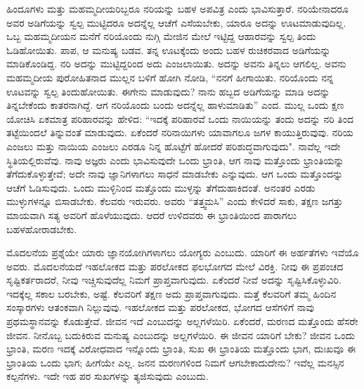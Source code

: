 ಹಿಂದೂಗಳು ಮತ್ತು ಮಹಮ್ಮದೀಯರಿಬ್ಬರೂ ನರಿಯನ್ನು ಬಹಳ ಅಪವಿತ್ರ ಎಂದು ಭಾವಿಸುತ್ತಾರೆ. ನರಿಯೇನಾದರೂ ಅವರ ಅಡಿಗೆಯನ್ನು ಸ್ವಲ್ಪ ಮುಟ್ಟಿದರೂ ಅದನ್ನೆಲ್ಲ ಆಚೆಗೆ ಎಸೆಯಬೇಕು, ಯಾರೂ ಅದನ್ನು ಊಟಮಾಡುವುದಿಲ್ಲ. ಒಬ್ಬ ಮಹಮ್ಮದೀಯನ ಮನೆಗೆ ನರಿಯೊಂದು ನುಗ್ಗಿ ಮೇಜಿನ ಮೇಲೆ ಇಟ್ಟಿದ್ದ ಆಹಾರವನ್ನು ಸ್ವಲ್ಪ ತಿಂದು ಓಡಿಹೋಯಿತು. ಪಾಪ, ಆ ಮನುಷ್ಯ ಬಡವ. ತನ್ನ ಊಟಕ್ಕೆಂದು ಅಂದು ಬಹಳ ರುಚಿಕರವಾದ ಅಡಿಗೆಯನ್ನು ಮಾಡಿಕೊಂಡಿದ್ದ. ನರಿ ಅದನ್ನು ಮುಟ್ಟಿದ್ದರಿಂದ ಅದು ಎಂಜಲಾಯಿತು. ಅದನ್ನು ಅವನು ತಿನ್ನಲು ಆಗಲಿಲ್ಲ. ಅವನು ಮಹಮ್ಮದೀಯ ಪುರೋಹಿತನಾದ ಮುಲ್ಲನ ಬಳಿಗೆ ಹೋಗಿ ನೋಡಿ, “ನನಗೆ ಹೀಗಾಯಿತು. ನರಿಯೊಂದು ನನ್ನ ಊಟವನ್ನು ಸ್ವಲ್ಪ ತಿಂದುಹೋಯಿತು. ಈಗೇನು ಮಾಡುವುದು? ನಾನು ಹಬ್ಬದ ಅಡಿಗೆಯನ್ನು ಮಾಡಿ ಅದನ್ನು ತಿನ್ನಬೇಕೆಂದು ಕಾತರನಾಗಿದ್ದೆ. ಆಗ ನರಿಯೊಂದು ಬಂದು ಅದನ್ನೆಲ್ಲ ಹಾಳುಮಾಡಿತು'' ಎಂದ. ಮುಲ್ಲ ಒಂದು ಕ್ಷಣ ಯೋಚಿಸಿ ಏಕಮಾತ್ರ ಪರಿಹಾರವನ್ನು ಹೇಳಿದ: “ಇದಕ್ಕೆ ಪರಿಹಾರವೆ ಒಂದು ನಾಯಿಯನ್ನು ತಂದು ಅದನ್ನು ನರಿ ತಿಂದ ತಟ್ಟೆಯಿಂದಲೆ ತಿನ್ನುವಂತೆ ಮಾಡುವುದು. ಏಕೆಂದರೆ ನರಿನಾಯಿಗಳು ಯಾವಾಗಲೂ ಜಗಳ ಕಾಯುತ್ತಿರುವುವು. ನರಿಯ ಎಂಜಲು ಮತ್ತು ನಾಯಿಯ ಎಂಜಲು ಎರಡೂ ನಿನ್ನ ಹೊಟ್ಟೆಗೆ ಹೋದರೆ ಪರಿಶುದ್ಧವಾಗುವುದು". ನಾವೆಲ್ಲ ಇದೇ ಸ್ಥಿತಿಯಲ್ಲಿರುವೆವು. ನಾವು ಅಜ್ಞರು ಎಂದು ಭಾವಿಸುವುದೇ ಒಂದು ಭ್ರಾಂತಿ, ಆಗ ನಾವು ಮತ್ತೊಂದು ಭ್ರಾಂತಿಯನ್ನು ತೆಗೆದುಕೊಳ್ಳುತ್ತೇವೆ; ಅದೇ ನಾವು ಜ್ಞಾನಿಗಳಾಗಲು ಸಾಧನೆ ಮಾಡಬೇಕು ಎನ್ನುವುದು. ಆಗ ಒಂದು ಮತ್ತೊಂದನ್ನು ಆಚೆಗೆ ಓಡಿಸುವುದು. ಒಂದು ಮುಳ್ಳಿನಿಂದ ಮತ್ತೊಂದು ಮುಳ್ಳನ್ನು ತೆಗೆದುಹಾಕಿದಂತೆ. ಅನಂತರ ಎರಡು ಮುಳ್ಳುಗಳನ್ನೂ ಬಿಸಾಡಬೇಕು. ಕೆಲವರು ಇರುವರು. ಅವರು “ತತ್ತ್ವಮಸಿ'' ಎಂದು ಕೇಳಿದರೆ ಸಾಕು, ತಕ್ಷಣ ಜಗತ್ತು ಮಾಯವಾಗಿ ಸತ್ಯ ಅವರಿಗೆ ಹೊಳೆಯುವುದು. ಆದರೆ ಉಳಿದವರು ಈ ಭ್ರಾಂತಿಯಿಂದ ಪಾರಾಗಲು ಬಹಳ\break ಹೋರಾಡಬೇಕು.

ಮೊದಲನೆಯ ಪ್ರಶ್ನೆಯೇ ಯಾರು ಜ್ಞಾನಯೋಗಿಗಳಾಗಲು ಯೋಗ್ಯರು ಎಂಬುದು. ಯಾರಿಗೆ ಈ ಅರ್ಹತೆಗಳು ಇವೆಯೊ ಅವರು. ಮೊದಲನೆಯದೆ ಇಹಲೋಕದ ಮತ್ತು ಪರಲೋಕದ ಫಲಭೋಗದ ಮೇಲೆ ವಿರಕ್ತಿ. ನೀವು ಈ ಪ್ರಪಂಚದ ಸೃಷ್ಟಿಕರ್ತರಾದರೆ, ನೀವು ಇಚ್ಚಿಸುವುದೆಲ್ಲ ನಿಮಗೆ ಪ್ರಾಪ್ತವಾಗುವುದು. ಏಕೆಂದರೆ ನೀವೆ ಅದನ್ನು ಸೃಷ್ಟಿಸಿಕೊಳ್ಳುವಿರಿ. ಇದಕ್ಕೆಲ್ಲ ಸಕಾಲ ಬರಬೇಕು, ಅಷ್ಟೆ. ಕೆಲವರಿಗೆ ತಕ್ಷಣ ಅದು ಪ್ರಾಪ್ತವಾಗುವುದು. ಮತ್ತೆ ಕೆಲವರಿಗೆ ತಮ್ಮ ಹಿಂದಿನ ಸಂಸ್ಕಾರಗಳು ಆತಂಕವಾಗಿ ನಿಲ್ಲುವುವು. ಇಹಲೋಕದ ಮತ್ತು ಪರಲೋಕದ, ಭೋಗದ ಆಸೆಗಳಿಗೆ ನಾವು ಪ್ರಥಮಸ್ಥಾನವನ್ನು ಕೊಡುತ್ತೇವೆ. ಜೀವನ ಇದೆ ಎಂಬುದನ್ನು ಅಲ್ಲಗಳೆಯಿರಿ. ಏಕೆಂದರೆ, ಮರಣದ ಮತ್ತೊಂದು ಹೆಸರೇ ಜೀವನ. ನೀನೊಬ್ಬ ಬದುಕಿರುವ ಮನುಷ್ಯ ಎಂಬುದನ್ನು ಅಲ್ಲಗಳೆಯಿರಿ. ಈ ಜೀವನ ಯಾರಿಗೆ ಬೇಕು? ಜೀವನ ಒಂದು ಭ್ರಾಂತಿ, ಮರಣ ಇದಕ್ಕೆ ವಿರೋಧವಾದ ಇನ್ನೊಂದು ಭ್ರಾಂತಿ, ಸುಖ ಈ ಭ್ರಾಂತಿಯ ಮತ್ತೊಂದು ಭಾಗ, ದುಃಖವೂ ಈ ಭ್ರಾಂತಿಯ ಒಂದು ಭಾಗ; ಹೀಗೆಯೇ ಎಲ್ಲ. ಜನನ ಮರಣಗಳಿಂದ ನಿಮಗೆ ಆಗಬೇಕಾದುದೇನು? ಇವೆಲ್ಲ ಮನಸ್ಸಿನ ಕಲ್ಪನೆಗಳು. ಇದೇ ಇಹ ಪರ ಸುಖಗಳನ್ನು ತ್ಯಜಿಸುವುದು ಎಂಬುದು.

